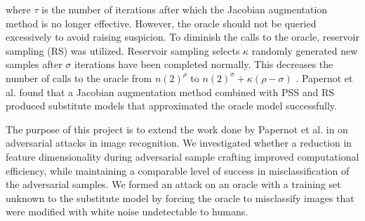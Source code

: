 where $\tau$ is the number of iterations after which the Jacobian augmentation method is no longer effective. However, the oracle should not be queried excessively to avoid raising suspicion. To diminish the calls to the oracle, reservoir sampling (RS) was utilized. Reservoir sampling selects $\kappa$ randomly generated new samples after $\sigma$ iterations have been completed normally. This decreases the number of calls to the oracle from $n(2)^{\rho}$ to $n(2)^{\sigma} + \kappa (\rho-\sigma)$ \cite{papernot3}. Papernot et al. found that a Jacobian augmentation method combined with PSS and RS produced substitute models that approximated the oracle model successfully. 

The purpose of this project is to extend the work done by Papernot et al. in \cite{papernot3} on adversarial attacks in image recognition. We investigated whether a reduction in feature dimensionality during adversarial sample crafting improved computational efficiency, while maintaining a comparable level of success in misclassification of the adversarial samples. We formed an attack on an oracle with a training set unknown to the substitute model by forcing the oracle to misclassify images that were modified with white noise undetectable to humans.